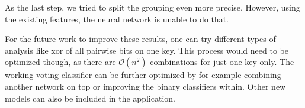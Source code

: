 As the last step, we tried to split the grouping even more precise. However, using the existing features, the neural network is unable to do that. 

For the future work to improve these results, one can try different types of analysis like xor of all pairwise bits on one key. This process would need to be optimized though, as there are $\mathcal{O}(n^2)$ combinations for just one key only. The working voting classifier can be further optimized by for example combining another network on top or improving the binary classifiers within. Other new models can also be included in the application.

